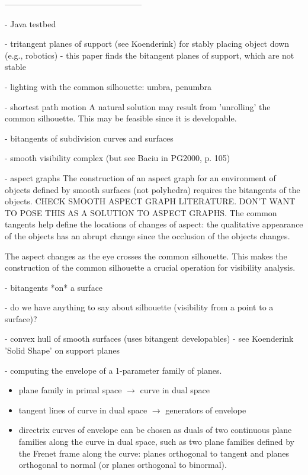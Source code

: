--------------------------------------------------

- Java testbed

- tritangent planes of support (see Koenderink)
  for stably placing object down (e.g., robotics)
  - this paper finds the bitangent planes of support, which are not stable
  
- lighting with the common silhouette: umbra, penumbra

- shortest path motion
 	A natural solution may result from 'unrolling' the common silhouette.
	This may be feasible since it is developable.

- bitangents of subdivision curves and surfaces

- smooth visibility complex (but see Baciu in PG2000, p. 105)

- aspect graphs
	The construction of an aspect graph for an environment of objects
	defined by smooth surfaces (not polyhedra)
	requires the bitangents of the objects.
	CHECK SMOOTH ASPECT GRAPH LITERATURE.
	DON'T WANT TO POSE THIS AS A SOLUTION TO ASPECT GRAPHS.
	The common tangents help define the locations of changes of aspect:
	the qualitative appearance of the objects has an abrupt change
	since the occlusion of the objects changes.
	
	The aspect changes as the eye crosses the common silhouette.
	This makes the construction of the common silhouette
	a crucial operation for visibility analysis.

- bitangents *on* a surface

- do we have anything to say about silhouette (visibility from a 
  point to a surface)?

- convex hull of smooth surfaces (uses bitangent developables)
	- see Koenderink 'Solid Shape' on support planes

- computing the envelope of a 1-parameter family of planes.
\begin{itemize}
\item plane family in primal space $\rightarrow$ curve in dual space
\item tangent lines of curve in dual space $\rightarrow$ 
      generators of envelope
\item directrix curves of envelope can be chosen as duals of two continuous
      plane families along the curve in dual space, 
      such as two plane families defined by the Frenet frame along the curve:
      planes orthogonal to tangent and planes orthogonal to normal
      (or planes orthogonal to binormal).
\end{itemize}

